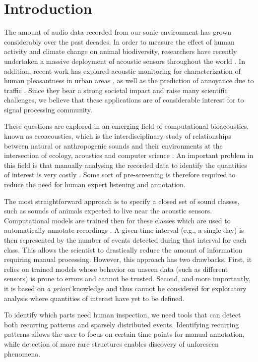 \documentclass[smallextended]{svjour3}
\begin{document}
\section{Introduction}

The amount of audio data recorded from our sonic environment has grown considerably over the past decades.
In order to measure the effect of human activity and climate change on animal biodiversity, researchers have recently undertaken a massive deployment of acoustic sensors throughout the world \cite{warren2006urban, NessSST13, stowell13b}.
In addition, recent work has explored acoustic monitoring for characterization of human pleasantness in urban areas \cite{guyot2005urban, ricciardi2015sound}, as well as the prediction of annoyance due to traffic \cite{gloaguen}.
Since they bear a strong societal impact and raise many scientific challenges, we believe that these applications are of considerable interest for to signal processing community.

These questions are explored in an emerging field of computational bioacoustics, known as ecoacoustics, which is the interdisciplinary study of relationships between natural or anthropogenic sounds and their environments at the intersection of ecology, acoustics and computer science \cite{krause}.
An important problem in this field is that manually analysing the recorded data to identify the quantities of interest is very costly \cite{wimmer2013sampling}. Some sort of pre-screening is therefore required to reduce the need for human expert listening and annotation.

The most straightforward approach is to specify a closed set of sound classes, such as sounds of animals expected to live near the acoustic sensors. Computational models are trained then  for these classes which are used to automatically annotate recordings \cite{quteprints96243}. A given time interval (e.g., a single day) is then represented by the number of events detected during that interval for each class. This allows the scientist to drastically reduce the amount of information requiring manual processing. However, this approach has two drawbacks. First, it relies on trained models whose behavior on unseen data (such as different sensors) is prone to errors and cannot be trusted. Second, and more importantly, it is based on \textit{a priori} knowledge and thus cannot be considered for exploratory analysis where quantities of interest have yet to be defined.

To identify which parts need human inspection, we need tools that can detect both recurring patterns and sparsely distributed events. Identifying recurring patterns allows the user to focus on certain time points for manual annotation, while detection of more rare structures enables discovery of unforeseen phenomena.
\end{document}
